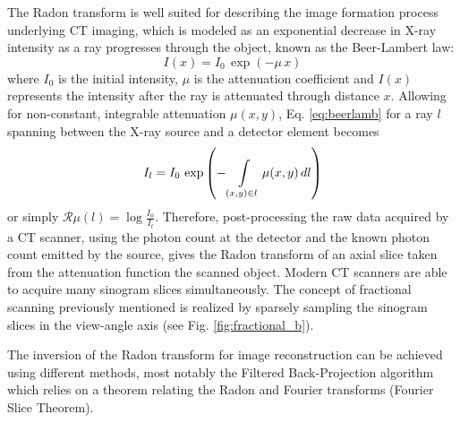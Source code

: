 The Radon transform is well suited for describing the image formation process underlying CT imaging, which is modeled as an exponential decrease in X-ray intensity as a ray progresses through the object, known as the Beer-Lambert law:
\begin{equation}
I(x) = I_0 \, \exp \left( -\mu \, x \right)
\label{eq:beerlamb}
\end{equation}
where $I_0$ is the initial intensity, $\mu$ is the attenuation coefficient and $I(x)$ represents the intensity after the ray is attenuated through distance $x$. Allowing for non-constant, integrable attenuation $\mu(x,y)$, Eq. \ref{eq:beerlamb} for a ray $l$ spanning between the X-ray source and a detector element becomes
\begin{equation}
I_l = I_0 \, \exp \left( - \int \displaylimits_{(x,y) \in l} \mu(x,y)\, dl \right)
\label{beerlamb}
\end{equation}
 or simply $\mathcal{R} \mu (l) = \log \frac{I_0}{I_l} $. Therefore, post-processing the raw data acquired by a CT scanner, using the photon count at the detector and the known photon count emitted by the source, gives the Radon transform of an axial slice taken from the attenuation function the scanned object. Modern CT scanners are able to acquire many sinogram slices simultaneously. 
 The concept of fractional scanning previously mentioned is realized by sparsely sampling the sinogram slices in the view-angle axis (see Fig. \ref{fig:fractional_b}). 
 
 The inversion of the Radon transform for image reconstruction can be achieved using different methods, most notably the Filtered Back-Projection algorithm which relies on a theorem relating the Radon and Fourier transforms (Fourier Slice Theorem).
 
